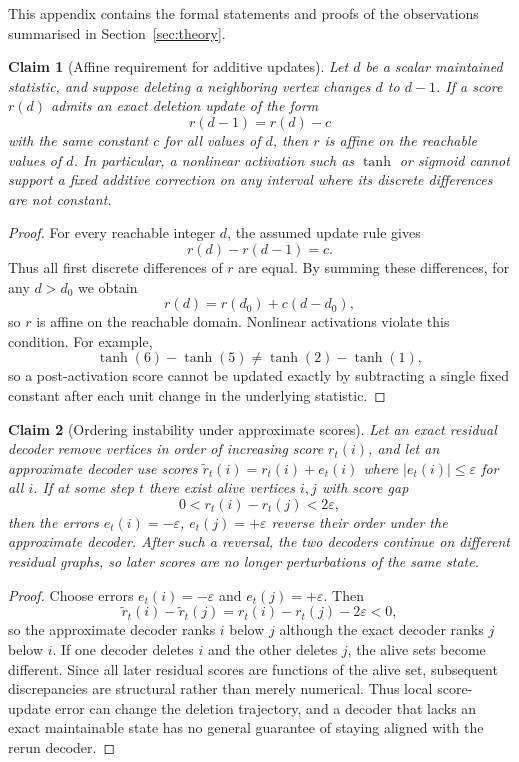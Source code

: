 \documentclass[mathematics,article,submit,pdftex,moreauthors]{Definitions/mdpi}
\newtheorem{claim}{Claim}[section]
\begin{document}
This appendix contains the formal statements and proofs of the observations
summarised in Section~\ref{sec:theory}.

\begin{claim}[Affine requirement for additive updates]
  \label{claim:affine_needed}
  Let $d$ be a scalar maintained statistic, and suppose deleting a neighboring vertex
  changes $d$ to $d-1$. If a score $r(d)$ admits an exact deletion update of the form
  \[
    r(d-1)=r(d)-c
  \]
  with the same constant $c$ for all values of $d$, then $r$ is affine on the
  reachable values of $d$. In particular, a nonlinear activation such as $\tanh$ or
  sigmoid cannot support a fixed additive correction on any interval where its
  discrete differences are not constant.
\end{claim}

\begin{proof}
  For every reachable integer $d$, the assumed update rule gives
  \[
    r(d)-r(d-1)=c .
  \]
  Thus all first discrete differences of $r$ are equal. By summing these differences,
  for any $d>d_0$ we obtain
  \[
    r(d)=r(d_0)+c(d-d_0),
  \]
  so $r$ is affine on the reachable domain. Nonlinear activations violate this
  condition. For example,
  \[
    \tanh(6)-\tanh(5) \neq \tanh(2)-\tanh(1),
  \]
  so a post-activation score cannot be updated exactly by subtracting a single fixed
  constant after each unit change in the underlying statistic.
\end{proof}

\begin{claim}[Ordering instability under approximate scores]
  \label{claim:ordering_instability}
  Let an exact residual decoder remove vertices in order of increasing score
  $r_t(i)$, and let an approximate decoder use scores
  $\tilde r_t(i)=r_t(i)+e_t(i)$ where $|e_t(i)|\le\varepsilon$ for all $i$. If
  at some step $t$ there exist alive vertices $i,j$ with score gap
  \[
    0 < r_t(i)-r_t(j) < 2\varepsilon,
  \]
  then the errors $e_t(i)=-\varepsilon$, $e_t(j)=+\varepsilon$ reverse their
  order under the approximate decoder. After such a reversal, the two decoders
  continue on different residual graphs, so later scores are no longer
  perturbations of the same state.
\end{claim}

\begin{proof}
  Choose errors $e_t(i)=-\varepsilon$ and $e_t(j)=+\varepsilon$. Then
  \[
    \tilde r_t(i)-\tilde r_t(j)
    =
    r_t(i)-r_t(j)-2\varepsilon
    <0,
  \]
  so the approximate decoder ranks $i$ below $j$ although the exact decoder ranks
  $j$ below $i$. If one decoder deletes $i$ and the other deletes $j$, the alive sets
  become different. Since all later residual scores are functions of the alive set,
  subsequent discrepancies are structural rather than merely numerical. Thus local
  score-update error can change the deletion trajectory, and a decoder that lacks an
  exact maintainable state has no general guarantee of staying aligned with the
  rerun decoder.
\end{proof}
\end{document}
